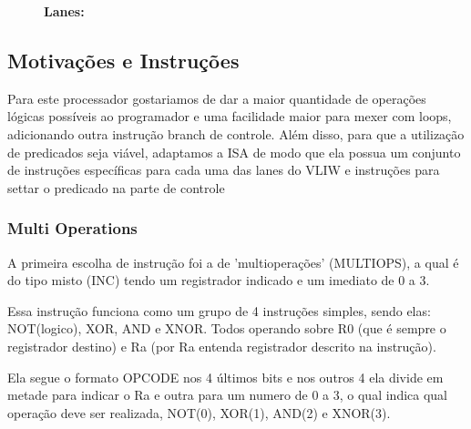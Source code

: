 \documentclass{article}
\begin{document}
    \begin{figure}[H]
        \captionsetup{labelformat=empty, skip=0pt}
        \caption{\textbf{Lanes:}}
        \centering 
    \end{figure}

    \subsection{Motivações e Instruções}

    Para este processador gostariamos de dar a maior quantidade de operações lógicas possíveis ao programador e uma facilidade maior para mexer com loops, adicionando outra instrução branch de controle. Além disso, para que a utilização de predicados seja viável, adaptamos a ISA de modo que ela possua um conjunto de instruções específicas para cada uma das lanes do VLIW e instruções para settar o predicado na parte de controle

    \subsubsection{Multi Operations}

    A primeira escolha de instrução foi a de 'multioperações' (MULTIOPS), a qual é do tipo misto (INC) tendo um
    registrador indicado e um imediato de 0 a 3.

    Essa instrução funciona como um grupo de 4 instruções simples, sendo elas: NOT(logico), XOR, AND e XNOR. Todos
    operando sobre R0 (que é sempre o registrador destino) e Ra (por Ra entenda registrador descrito na instrução).

    Ela segue o formato OPCODE nos 4 últimos bits e nos outros 4 ela divide em metade para indicar o
    Ra e outra para um numero de 0 a 3, o qual indica qual operação deve ser realizada, NOT(0), XOR(1),
    AND(2) e XNOR(3).
\end{document}
